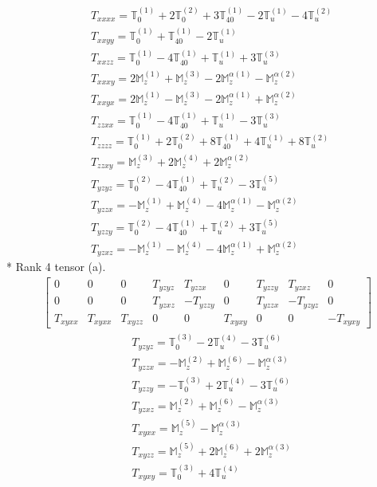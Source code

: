 \documentclass[fleqn,8pt,landscape]{jsarticle}
\begin{document}
\begin{align*}
& T_{xxxx} = \mathbb{T}_{0}^{(1)} + 2 \mathbb{T}_{0}^{(2)} + 3 \mathbb{T}_{40}^{(1)} - 2 \mathbb{T}_{u}^{(1)} - 4 \mathbb{T}_{u}^{(2)} \\
& T_{xxyy} = \mathbb{T}_{0}^{(1)} + \mathbb{T}_{40}^{(1)} - 2 \mathbb{T}_{u}^{(1)} \\
& T_{xxzz} = \mathbb{T}_{0}^{(1)} - 4 \mathbb{T}_{40}^{(1)} + \mathbb{T}_{u}^{(1)} + 3 \mathbb{T}_{u}^{(3)} \\
& T_{xxxy} = 2 \mathbb{M}_{z}^{(1)} + \mathbb{M}_{z}^{(3)} - 2 \mathbb{M}_{z}^{\alpha(1)} - \mathbb{M}_{z}^{\alpha(2)} \\
& T_{xxyx} = 2 \mathbb{M}_{z}^{(1)} - \mathbb{M}_{z}^{(3)} - 2 \mathbb{M}_{z}^{\alpha(1)} + \mathbb{M}_{z}^{\alpha(2)} \\
& T_{zzxx} = \mathbb{T}_{0}^{(1)} - 4 \mathbb{T}_{40}^{(1)} + \mathbb{T}_{u}^{(1)} - 3 \mathbb{T}_{u}^{(3)} \\
& T_{zzzz} = \mathbb{T}_{0}^{(1)} + 2 \mathbb{T}_{0}^{(2)} + 8 \mathbb{T}_{40}^{(1)} + 4 \mathbb{T}_{u}^{(1)} + 8 \mathbb{T}_{u}^{(2)} \\
& T_{zzxy} = \mathbb{M}_{z}^{(3)} + 2 \mathbb{M}_{z}^{(4)} + 2 \mathbb{M}_{z}^{\alpha(2)} \\
& T_{yzyz} = \mathbb{T}_{0}^{(2)} - 4 \mathbb{T}_{40}^{(1)} + \mathbb{T}_{u}^{(2)} - 3 \mathbb{T}_{u}^{(5)} \\
& T_{yzzx} = - \mathbb{M}_{z}^{(1)} + \mathbb{M}_{z}^{(4)} - 4 \mathbb{M}_{z}^{\alpha(1)} - \mathbb{M}_{z}^{\alpha(2)} \\
& T_{yzzy} = \mathbb{T}_{0}^{(2)} - 4 \mathbb{T}_{40}^{(1)} + \mathbb{T}_{u}^{(2)} + 3 \mathbb{T}_{u}^{(5)} \\
& T_{yzxz} = - \mathbb{M}_{z}^{(1)} - \mathbb{M}_{z}^{(4)} - 4 \mathbb{M}_{z}^{\alpha(1)} + \mathbb{M}_{z}^{\alpha(2)}
\end{align*}
* Rank 4 tensor (a).
\begin{align*}
\begin{bmatrix} 0 & 0 & 0 & T_{yzyz} & T_{yzzx} & 0 & T_{yzzy} & T_{yzxz} & 0 \\ 0 & 0 & 0 & T_{yzxz} & - T_{yzzy} & 0 & T_{yzzx} & - T_{yzyz} & 0 \\ T_{xyxx} & T_{xyxx} & T_{xyzz} & 0 & 0 & T_{xyxy} & 0 & 0 & - T_{xyxy} \end{bmatrix}
\end{align*}
\begin{align*}
& T_{yzyz} = \mathbb{T}_{0}^{(3)} - 2 \mathbb{T}_{u}^{(4)} - 3 \mathbb{T}_{u}^{(6)} \\
& T_{yzzx} = - \mathbb{M}_{z}^{(2)} + \mathbb{M}_{z}^{(6)} - \mathbb{M}_{z}^{\alpha(3)} \\
& T_{yzzy} = - \mathbb{T}_{0}^{(3)} + 2 \mathbb{T}_{u}^{(4)} - 3 \mathbb{T}_{u}^{(6)} \\
& T_{yzxz} = \mathbb{M}_{z}^{(2)} + \mathbb{M}_{z}^{(6)} - \mathbb{M}_{z}^{\alpha(3)} \\
& T_{xyxx} = \mathbb{M}_{z}^{(5)} - \mathbb{M}_{z}^{\alpha(3)} \\
& T_{xyzz} = \mathbb{M}_{z}^{(5)} + 2 \mathbb{M}_{z}^{(6)} + 2 \mathbb{M}_{z}^{\alpha(3)} \\
& T_{xyxy} = \mathbb{T}_{0}^{(3)} + 4 \mathbb{T}_{u}^{(4)}
\end{align*}
\end{document}
